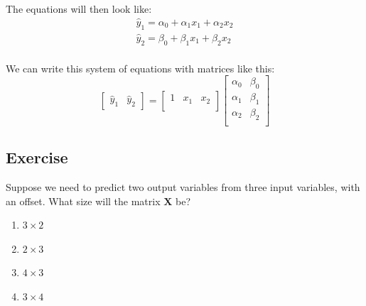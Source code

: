 \documentclass[11pt]{article}
\newcommand\xmtx{\boldsymbol{X}}
\newcommand\yhat{\hat{y}}
\begin{document}
The equations will then look like:
\begin{equation}
    \begin{array}{l}
    \yhat_1 = \alpha_0 + \alpha_1 x_1  + \alpha_2 x_2 \\
    \yhat_2 = \beta_0 + \beta_1 x_1  + \beta_2 x_2 \\
    \end{array}
\end{equation}

We can write this system of equations with matrices like this:
\begin{equation}
    \begin{bmatrix}
        \yhat_1 & \yhat_2
    \end{bmatrix} = 
    \begin{bmatrix}
        1 & x_1 & x_2 \\
    \end{bmatrix}
    \begin{bmatrix}
        \alpha_0 & \beta_0 \\
        \alpha_1 & \beta_1 \\
        \alpha_2 & \beta_2 \\
    \end{bmatrix}
\end{equation}




\subsection{ Exercise }

Suppose we need to predict two output variables from three input
variables, with an offset.  What size will the matrix $\xmtx$ be?
\begin{enumerate}
    \item $3 \times 2$
    \item $2 \times 3$
    \item $4 \times 3$
    \item $3 \times 4$
\end{enumerate}



\end{document}
